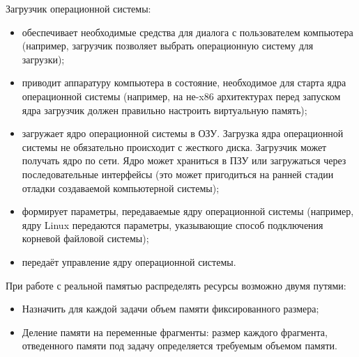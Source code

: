 \documentclass[unicode, 12pt, a4paper, oneside]{article}
\begin{document}
Загрузчик операционной системы:

\begin{itemize}
\item обеспечивает необходимые средства для диалога с пользователем компьютера (например, загрузчик позволяет выбрать операционную систему для загрузки);
\item приводит аппаратуру компьютера в состояние, необходимое для старта ядра операционной системы (например, на не-x86 архитектурах перед запуском ядра загрузчик должен правильно настроить виртуальную память);
\item загружает ядро операционной системы в ОЗУ. Загрузка ядра операционной системы не обязательно происходит с жесткого диска. Загрузчик может получать ядро по сети. Ядро может храниться в ПЗУ или загружаться через последовательные интерфейсы (это может пригодиться на ранней стадии отладки создаваемой компьютерной системы);
\item формирует параметры, передаваемые ядру операционной системы (например, ядру Linux передаются параметры, указывающие способ подключения корневой файловой системы);
\item передаёт управление ядру операционной системы. 
\end{itemize}

При работе с реальной памятью распределять ресурсы возможно двумя путями:

\begin{itemize}
\item Назначить для каждой задачи объем памяти фиксированного размера;
\item Деление памяти на переменные фрагменты: размер каждого фрагмента, отведенного памяти под задачу определяется требуемым объемом памяти.
\end{itemize}
\end{document}

